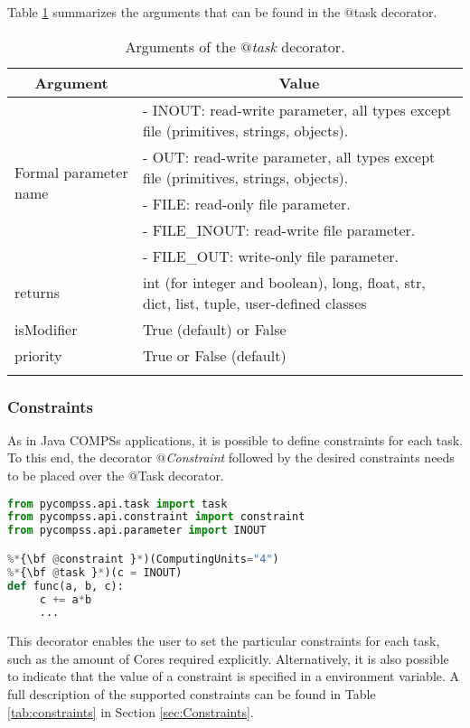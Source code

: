 Table \ref{tab:task_decorator_arguments} summarizes the arguments that can be found in the $@$task decorator.
\bgroup
  \def\arraystretch{1.5}%
  \begin{longtable}{| p{} | p{} |}
    \hline
    \multicolumn{1}{|c|}{{\bf Argument }}    &  \multicolumn{1}{c|}{{\bf Value }}\\
    \hline
    \multirow{5}{*}{Formal parameter name}  &  - INOUT: read-write parameter, all types except file (primitives, strings, objects). \\
    & - OUT: read-write parameter, all types except file (primitives, strings, objects). \\
    & - FILE: read-only file parameter. \\
    & - FILE\_INOUT: read-write file parameter. \\
    & - FILE\_OUT: write-only file parameter. \\
    \hline
    returns & int (for integer and boolean), long, float, str, dict, list, tuple, user-defined classes \\
    \hline
    isModifier &  True (default) or False \\
    \hline
    priority  & True or False (default) \\
    \hline
    \caption{Arguments of the {\it $@$task} decorator.}
    \label{tab:task_decorator_arguments}
  \end{longtable}
\egroup


\subsubsection{Constraints}

As in Java COMPSs applications, it is possible to define constraints for each task.
To this end, the decorator {\it $@$Constraint} followed by the desired constraints needs to be placed over the $@$Task decorator.

\begin{lstlisting}[language=python]
from pycompss.api.task import task
from pycompss.api.constraint import constraint
from pycompss.api.parameter import INOUT

%*{\bf @constraint }*)(ComputingUnits="4")
%*{\bf @task }*)(c = INOUT)
def func(a, b, c):
     c += a*b
     ...
\end{lstlisting}

This decorator enables the user to set the particular constraints for each task, such as the amount of Cores required explicitly.
Alternatively, it is also possible to indicate that the value of a constraint is specified in a environment variable.
A full description of the supported constraints can be found in Table \ref{tab:constraints} in Section \ref{sec:Constraints}.

